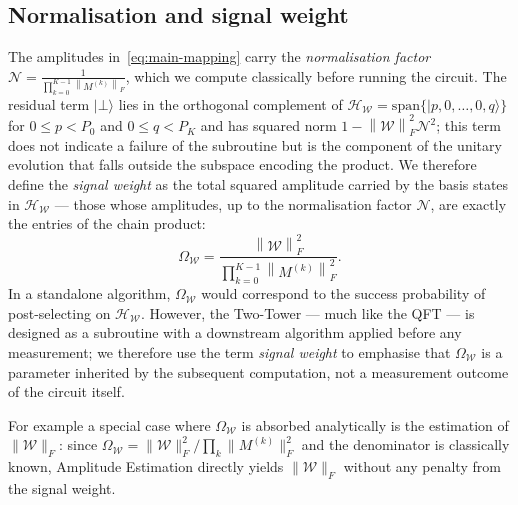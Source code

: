 \documentclass[a4paper,UKenglish,cleveref,autoref,thm-restate]{socg-lipics-v2021}
\providecommand{\ket}[1]{\lvert #1 \rangle}
\newcommand{\norm}[1]{\left\| #1 \right\|}
\begin{document}
\subsection{Normalisation and signal weight}\label{subsec:normalisation-signal}
The amplitudes in~\cref{eq:main-mapping} carry the \emph{normalisation factor} $\mathcal{N} = \frac{1}{\prod_{k=0}^{K-1} \norm{M^{(k)}}_F}$, which we compute classically before running the circuit. The residual term $\ket{\bot}$ lies in the orthogonal complement of $\mathcal{H}_{\mathcal{W}} = \mathrm{span}\{ \lvert p,0,\ldots,0,q \rangle \}$ for $0 \leq p < P_0$ and $0 \leq q < P_K$ and has squared norm $1 - \norm{\mathcal{W}}_F^2 \mathcal{N}^2$; this term does not indicate a failure of the subroutine but is the component of the unitary evolution that falls outside the subspace encoding the product. We therefore define the \emph{signal weight} as the total squared amplitude carried by the basis states in $\mathcal{H}_{\mathcal{W}}$ --- those whose amplitudes, up to the normalisation factor $\mathcal{N}$, are exactly the entries of the chain product:
$$
\Omega_{\mathcal{W}}
= \frac{\norm{\mathcal{W}}_F^2}{\prod_{k=0}^{K-1} \norm{M^{(k)}}_F^2}.
$$
In a standalone algorithm, $\Omega_{\mathcal{W}}$ would correspond to the success probability of post-selecting on $\mathcal{H}_\mathcal{W}$. However, the Two-Tower --- much like the QFT --- is designed as a subroutine with a downstream algorithm applied before any measurement; we therefore use the term \emph{signal weight} to emphasise that $\Omega_{\mathcal{W}}$ is a parameter inherited by the subsequent computation, not a measurement outcome of the circuit itself. 


For example a  special case where $\Omega_{\mathcal{W}}$ is absorbed analytically is the estimation  of $\|\mathcal{W}\|_F$: since $\Omega_{\mathcal{W}} = \|\mathcal{W}\|_F^2 / \prod_k \|M^{(k)}\|_F^2
$ and the denominator is classically known, Amplitude Estimation %
directly yields $\|\mathcal{W}\|_F$ without any penalty from the signal weight. 
\end{document}

